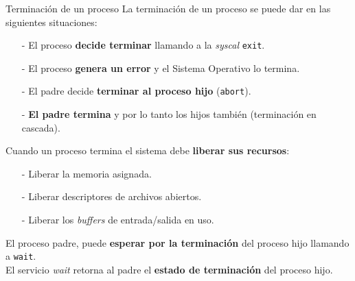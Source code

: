 \documentclass[aspectratio=169]{beamer}
\begin{document}
\begin{frame}[t]{Terminación de un proceso}
    La terminación de un proceso se puede dar en las siguientes situaciones:
    \begin{itemize}
    \item[-] El proceso \textcolor{naranjauca}{\textbf{decide terminar}} llamando a la \emph{syscal} \texttt{exit}.
    \item[-] El proceso \textcolor{naranjauca}{\textbf{genera un error}} y el Sistema Operativo lo termina.
    \item[-] El padre decide \textcolor{naranjauca}{\textbf{terminar al proceso hijo}} (\texttt{abort}).
    \item[-] \textcolor{naranjauca}{\textbf{El padre termina}} y por lo tanto los hijos también (terminación en cascada).
    \end{itemize}
    \medskip
    \pause
    \begin{tcolorbox}[size=small,width=0.7\textwidth,sharp corners,title={}]
    \small
    \color{verdeuca}
    Cuando un proceso termina el sistema debe \textbf{liberar sus recursos}:
    \begin{itemize} \color{verdeuca}
    \setlength\itemsep{0cm}
        \item[\textcolor{verdeuca}{-}] Liberar la memoria asignada.
        \item[\textcolor{verdeuca}{-}] Liberar descriptores de archivos abiertos.
        \item[\textcolor{verdeuca}{-}] Liberar los \emph{buffers} de entrada/salida en uso.
    \end{itemize}
    \end{tcolorbox}
    \medskip
    \pause
    El proceso padre, puede \textcolor{verdeuca}{\textbf{esperar por la terminación}} del proceso hijo llamando a \texttt{wait}.\\
    \medskip
    El servicio \emph{wait} retorna al padre el \textcolor{verdeuca}{\textbf{estado de terminación}} del proceso hijo.
\end{frame}
\end{document}
